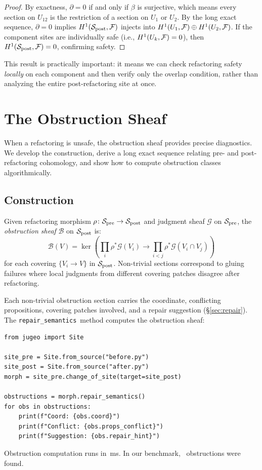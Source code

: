 \documentclass[11pt]{article}
\newcommand{\RepairSem}{\texttt{repair\_semantics}}
\newcommand{\SitePre}{\Site_{\mathrm{pre}}}
\newcommand{\SitePost}{\Site_{\mathrm{post}}}
\newcommand{\RefactorMorph}{\rho}
\newcommand{\ObstructionSheaf}{\mathcal{B}}
\begin{document}
\begin{proof}
By exactness, $\partial = 0$ if and only if $\beta$ is surjective,
which means every section on $U_{12}$ is the restriction of a section
on $U_1$ or $U_2$.  By the long exact sequence, $\partial = 0$ implies
$\Hcoh{1}(\SitePost, \mathcal{F})$ injects into
$H^{1}(U_1, \mathcal{F}) \oplus H^{1}(U_2, \mathcal{F})$.
If the component sites are individually safe (i.e.,
$H^{1}(U_k, \mathcal{F}) = 0$), then
$\Hcoh{1}(\SitePost, \mathcal{F}) = 0$, confirming safety.
\end{proof}

This result is practically important: it means we can check refactoring
safety \emph{locally} on each component and then verify only the overlap
condition, rather than analyzing the entire post-refactoring site at
once.

\section{The Obstruction Sheaf}\label{sec:obstructions}

When a refactoring is unsafe, the obstruction sheaf provides precise
diagnostics.  We develop the construction, derive a long exact sequence
relating pre- and post-refactoring cohomology, and show how to compute
obstruction classes algorithmically.

\subsection{Construction}\label{ssec:obstruction-construction}

\begin{definition}\label{def:obstruction-sheaf}
Given refactoring morphism $\RefactorMorph \colon \SitePre \to
\SitePost$ and judgment sheaf $\mathcal{G}$ on $\SitePre$, the
\emph{obstruction sheaf} $\ObstructionSheaf$ on $\SitePost$ is:
\[
  \ObstructionSheaf(V) = \ker\!\left(
    \prod_{i} \RefactorMorph^{*}\mathcal{G}(V_i) \to
    \prod_{i < j} \RefactorMorph^{*}\mathcal{G}(V_i \cap V_j)
  \right)
\]
for each covering $\{V_i \to V\}$ in $\SitePost$.  Non-trivial sections
correspond to gluing failures where local judgments from different
covering patches disagree after refactoring.
\end{definition}

Each non-trivial obstruction section carries the coordinate, conflicting
propositions, covering patches involved, and a repair suggestion
(§\ref{sec:repair}).  The \RepairSem\ method computes the obstruction
sheaf:
\begin{lstlisting}[style=jugeo-python]
from jugeo import Site

site_pre = Site.from_source("before.py")
site_post = Site.from_source("after.py")
morph = site_pre.change_of_site(target=site_post)

obstructions = morph.repair_semantics()
for obs in obstructions:
    print(f"Coord: {obs.coord}")
    print(f"Conflict: {obs.props_conflict}")
    print(f"Suggestion: {obs.repair_hint}")
\end{lstlisting}
Obstruction computation runs in \compProfRepairSemanticsMeanMs\,ms.
In our benchmark, \compObstructionTotal\ obstructions were found.
\end{document}
